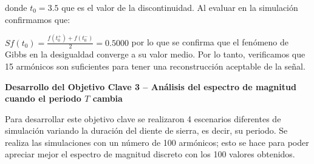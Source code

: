 \documentclass[11pt,a4paper,twocolumn]{article}
\begin{document}
    donde $t_0=3.5$ que es el valor de la discontinuidad. Al evaluar en la simulación 
    confirmamos que:
    
     $Sf(t_0)=\frac{f(t_0^+)+f(t_0^-)}{2}=0.5000$ por lo que se confirma que el fenómeno de Gibbs 
     en la desigualdad converge a su valor medio. Por lo tanto, verificamos que 15 armónicos 
     son suficientes para tener una reconstrucción aceptable de la señal. 
     
     \textbf{Desarrollo del Objetivo Clave 3 -- Análisis del espectro de magnitud cuando el periodo $T$ cambia}
     
     
     Para desarrollar este objetivo clave se realizaron 4 escenarios diferentes de simulación variando la 
     duración del diente de sierra, es decir, su periodo. Se realiza las simulaciones con un número 
     de 100 armónicos; esto se hace para poder apreciar mejor el espectro de magnitud 
     discreto con los 100 valores obtenidos.
\end{document}
